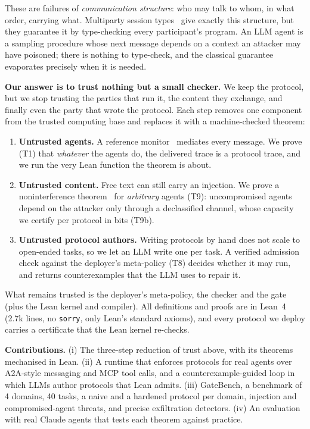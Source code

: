 \documentclass[10pt,twocolumn]{article}
\newcommand{\code}[1]{\texttt{\small #1}}
\begin{document}
These are failures of \emph{communication structure}: who may talk to whom, in what order, carrying what.
Multiparty session types~\cite{honda2008mpst,honda2016mpst} give exactly this structure, but they guarantee it by
type-checking every participant's program. An LLM agent is a sampling procedure whose next message depends on a
context an attacker may have poisoned; there is nothing to type-check, and the classical guarantee evaporates
precisely when it is needed.

\textbf{Our answer is to trust nothing but a small checker.} We keep the protocol, but we stop trusting the parties
that run it, the content they exchange, and finally even the party that wrote the protocol. Each step removes one
component from the trusted computing base and replaces it with a machine-checked theorem:
\begin{enumerate}
\item \textbf{Untrusted agents.} A reference monitor~\cite{schneider2000enforceable} mediates every message.
We prove (T1) that \emph{whatever} the agents do, the delivered trace is a protocol trace, and we run
the very Lean function the theorem is about.
\item \textbf{Untrusted content.} Free text can still carry an injection. We prove a noninterference
theorem~\cite{goguen1982security} for \emph{arbitrary} agents (T9): uncompromised agents depend on the
attacker only through a declassified channel, whose capacity we certify per protocol in bits (T9b).
\item \textbf{Untrusted protocol authors.} Writing protocols by hand does not scale to open-ended tasks, so we let
an LLM write one per task. A verified admission check against the deployer's meta-policy (T8) decides
whether it may run, and returns counterexamples that the LLM uses to repair it.
\end{enumerate}
What remains trusted is the deployer's meta-policy, the checker and the gate (plus the Lean kernel and compiler).
All definitions and proofs are in Lean~4 (2.7k lines, no \code{sorry}, only Lean's standard axioms), and every
protocol we deploy carries a certificate that the Lean kernel re-checks.

\textbf{Contributions.} (i) The three-step reduction of trust above, with its theorems mechanised in Lean.
(ii) A runtime that enforces protocols for real agents over A2A-style messaging and MCP tool calls, and a
counterexample-guided loop in which LLMs author protocols that Lean admits. (iii) GateBench, a benchmark of 4
domains, 40 tasks, a naive and a hardened protocol per domain, injection and compromised-agent threats, and
precise exfiltration detectors. (iv) An evaluation with real Claude agents that tests each theorem against
practice.
\end{document}
